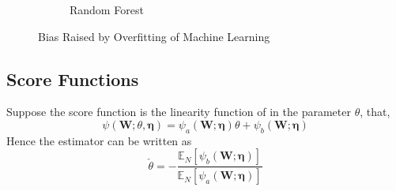 \documentclass[en,mtpro2]{elegantpaper}
\begin{document}
\begin{figure}[htpb]
\begin{subfigure}{.45\textwidth}
        \caption{Random Forest}
    \end{subfigure}
    \caption{Bias Raised by Overfitting of Machine Learning}
\end{figure}

\subsection{Score Functions}

\begin{definition}

\end{definition}

\begin{remark}
    Suppose the score function is the linearity function of in the parameter $\theta$, that,
    \begin{equation}
        \psi\left(\mathbf{W};\theta,\boldsymbol{\eta}\right)=\psi_{a}\left(\mathbf{W};\boldsymbol{\eta}\right)\theta+\psi_{b}\left(\mathbf{W};\boldsymbol{\eta}\right)
    \end{equation}
    Hence the estimator can be written as
    \begin{equation}
        \check{\theta}=-\frac{\mathbb{E}_{N}\left[\psi_{b}\left(\mathbf{W};\boldsymbol{\eta}\right)\right]}{\mathbb{E}_{N}\left[\psi_{a}\left(\mathbf{W};\boldsymbol{\eta}\right)\right]}
    \end{equation}
\end{remark}
\end{document}
